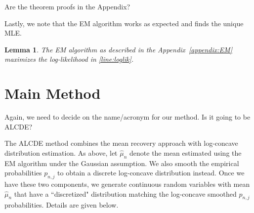 \documentclass[12pt]{article} %
\newtheorem{lemma}[theorem]{Lemma}
\newcommand{\comC}[1]{{\noindent  \color{orange}#1}}
\newcommand{\comH}[1]{{\noindent \color{blue}#1}}
\begin{document}
\comC{Are the theorem proofs in the Appendix?}

Lastly, we note that the EM algorithm works as expected and finds the unique MLE.


\begin{lemma}\label{lem:mle_em}
The EM algorithm as described in the Appendix~\ref{appendix:EM} maximizes the log-likelihood in \eqref{line:loglik}.
\end{lemma}


























\section{Main Method}\label{method}

\comC{Again, we need to decide on the name/acronym for our method. Is it going to be ALCDE?}

The ALCDE method combines the mean recovery approach with log-concave distribution estimation.  As above, let $\widehat \mu_n$ denote the mean estimated using the EM algorithm under the Gaussian assumption.  We also smooth the empirical probabilities $p_{n,j}$ to obtain a discrete log-concave distribution instead. Once we have these two components, we generate continuous random variables with mean $\widehat \mu_n$ that have a ``discretized" distribution matching the log-concave smoothed $p_{n,j}$ probabilities.   Details are given below.



\end{document}
